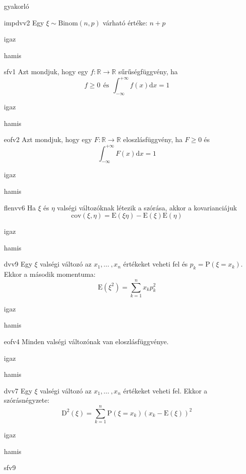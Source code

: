 \documentclass[12pt]{article}
\begin{document}
\begin{quiz}{gyakorló}
\begin{multi}[feedback={$\xi=\xi_1+{...\:}+\xi_n$, ahol $\xi_k$ Bernoulli és $\mathrm{E}(\xi_k)=p$+$\mathrm{E}$-additívitása}]{impdvv2}
Egy $\xi\sim \mathrm{Binom}(n,p)$ várható értéke: $n+p$
\item igaz
\item* hamis
\end{multi}
\begin{multi}[feedback={Def.}]{sfv1}
Azt mondjuk, hogy egy $f:\mathbb{R}\to \mathbb{R}$ sűrűségfüggvény, ha 
$$
f\ge 0 \ \ \text{és}\ \ \int_{-\infty}^{+\infty}f(x)\mathrm{d } x=1
$$
\item* igaz
\item hamis
\end{multi}
\begin{multi}[feedback={Ebből nem jön ki a pl. a monotonitás vagy a balról folytonosság.}]{eofv2}
Azt mondjuk, hogy egy $F:\mathbb{R}\to \mathbb{R}$ eloszlásfüggvény, ha $F\ge 0$ és 
$$
\int_{-\infty}^{+\infty}F(x)\mathrm{d } x=1
$$
\item igaz
\item* hamis
\end{multi}
\begin{multi}[feedback={Tulajdonság.}]{flenvv6}
Ha $\xi$ és $\eta$ valségi változóknak létezik a szórása, akkor a 
kovarianciájuk
$$
\mathrm{cov}(\xi,\eta)=\mathrm{E}(\xi\eta)-\mathrm{E}(\xi)\mathrm{E}(\eta)
$$
\item* igaz
\item hamis
\end{multi}
\begin{multi}[feedback={Def.}]{dvv9}
Egy $\xi$ valségi változó az $x_1,{...\:}, x_n$ értékeket veheti fel és $p_k=\mathrm{P}(\xi=x_k)$. 
Ekkor a második momentuma:
$$
\mathrm{E}(\xi^2)=\sum_{k=1}^n x_k p_k^2
$$
\item igaz
\item* hamis
\end{multi}
\begin{multi}[feedback={Hiszen $F(x)=\mathrm{P}(\xi<x)$, és ez mindig értelmes.}]{eofv4}
Minden valségi változónak van eloszlásfüggvénye.
\item* igaz
\item hamis
\end{multi}
\begin{multi}[feedback={Def.}]{dvv7}
Egy $\xi$ valségi változó az $x_1,{...\:}, x_n$ értékeket veheti fel. Ekkor a szórásnégyzete:
$$
\mathrm{D}^2(\xi)=\sum_{k=1}^n \mathrm{P}(\xi=x_k)(x_k-\mathrm{E}(\xi))^2
$$
\item* igaz
\item hamis
\end{multi}
\begin{multi}[feedback={Def.}]{sfv9}

\end{multi}
\end{quiz}
\end{document}
